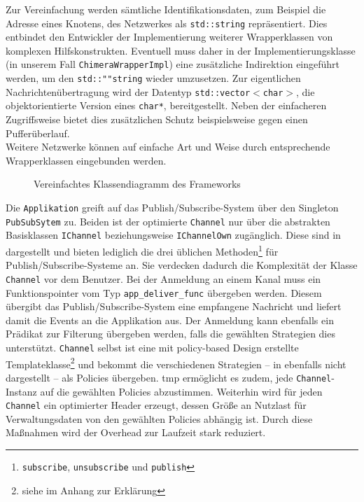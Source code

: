 Zur Vereinfachung werden sämtliche Identifikationsdaten, zum Beispiel die Adresse eines Knotens, des Netzwerkes als \texttt{std::string} repräsentiert. Dies entbindet den Entwickler der Implementierung weiterer Wrapperklassen von komplexen Hilfskonstrukten. Eventuell muss daher in der Implementierungsklasse (in unserem Fall \texttt{ChimeraWrapperImpl}) eine zusätzliche Indirektion eingeführt werden, um den \texttt{std::""string} wieder umzusetzen. Zur eigentlichen Nachrichtenübertragung wird der Datentyp \texttt{std::vector$<$char$>$}, die objektorientierte Version eines \texttt{char*}, bereitgestellt. Neben der einfacheren Zugriffsweise bietet dies zusätzlichen Schutz beispielsweise gegen einen Pufferüberlauf.\\
Weitere Netzwerke können auf einfache Art und Weise durch entsprechende Wrapperklassen eingebunden werden.

\begin{figure}[htbp]
\centering
{}
\caption{Vereinfachtes Klassendiagramm des Frameworks}
\label{fig:uml}
\end{figure}

Die \texttt{Applikation} greift auf das Publish/Subscribe-System über den Singleton \texttt{PubSub\-Sytem} zu. Beiden ist der optimierte \texttt{Channel} nur über die abstrakten Basisklassen \texttt{IChannel} beziehungsweise \texttt{IChannelOwn} zugänglich. Diese sind in  dargestellt und bieten lediglich die drei üblichen Methoden\footnote{\texttt{subscribe}, \texttt{unsubscribe} und \texttt{publish}} für Publish/Subscribe-Systeme an. Sie verdecken dadurch die Komplexität der Klasse \texttt{Channel} vor dem Benutzer. Bei der Anmeldung an einem Kanal muss ein Funktionspointer vom Typ \texttt{app\_deliver\_func} übergeben werden. Diesem übergibt das Publish/Subscribe-System eine empfangene Nachricht und liefert damit die Events an die Applikation aus. Der Anmeldung kann ebenfalls ein Prädikat zur Filterung übergeben werden, falls die gewählten Strategien dies unterstützt. \texttt{Channel} selbst ist eine mit policy-based Design erstellte Templateklasse\footnote{siehe  im Anhang zur Erklärung} und bekommt die verschiedenen Strategien -- in  ebenfalls nicht dargestellt -- als Policies übergeben. \ac{tmp} ermöglicht es zudem, jede \texttt{Channel}-Instanz auf die gewählten Policies abzustimmen. Weiterhin wird für jeden \texttt{Channel} ein optimierter Header erzeugt, dessen Größe an Nutzlast für Verwaltungsdaten von den gewählten Policies abhängig ist. Durch diese Maßnahmen wird der Overhead zur Laufzeit stark reduziert. 

